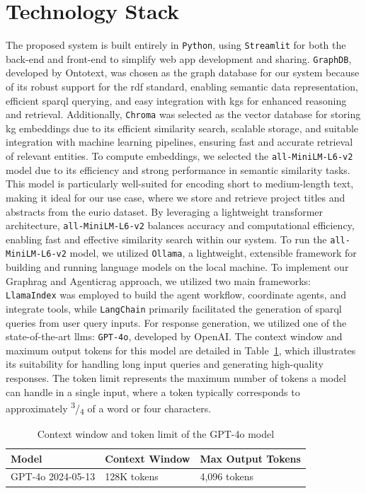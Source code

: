 \section{Technology Stack}\label{sec:technology-stack}
The proposed system is built entirely in \texttt{Python}, using \texttt{Streamlit} for both the back-end and front-end to simplify web app development and sharing.
\texttt{GraphDB}, developed by Ontotext, was chosen as the graph database for our system because of its robust support for the \gls{rdf} standard, enabling semantic data representation, efficient \gls{sparql} querying, and easy integration with \glspl{kg} for enhanced reasoning and retrieval.
Additionally, \texttt{Chroma} was selected as the vector database for storing \gls{kg} embeddings due to its efficient similarity search, scalable storage, and suitable integration with machine learning pipelines, ensuring fast and accurate retrieval of relevant entities.
To compute embeddings, we selected the \texttt{all-MiniLM-L6-v2} model due to its efficiency and strong performance in semantic similarity tasks.
This model is particularly well-suited for encoding short to medium-length text, making it ideal for our use case, where we store and retrieve project titles and abstracts from the \gls{eurio} dataset.
By leveraging a lightweight transformer architecture, \texttt{all-MiniLM-L6-v2} balances accuracy and computational efficiency, enabling fast and effective similarity search within our system.
To run the \texttt{all-MiniLM-L6-v2} model, we utilized \texttt{Ollama}, a lightweight, extensible framework for building and running language models on the local machine.
To implement our Graph\gls{rag} and Agentic\gls{rag} approach, we utilized two main frameworks: \texttt{LlamaIndex} was employed to build the agent workflow, coordinate agents, and integrate tools, while \texttt{LangChain} primarily facilitated the generation of \gls{sparql} queries from user query inputs.
For response generation, we utilized one of the state-of-the-art \glspl{llm}: \texttt{GPT-4o}, developed by OpenAI.
The context window and maximum output tokens for this model are detailed in Table~\ref{table:gpt-4o-tokens}, which illustrates its suitability for handling long input queries and generating high-quality responses.
The token limit represents the maximum number of tokens a model can handle in a single input, where a token typically corresponds to approximately \textsuperscript{3}/\textsubscript{4} of a word or four characters.

\begin{table}[htbp]
    \centering
    \scriptsize
    \begin{tabularx}{\textwidth}{|X|X|X|}
      \hline
      \textbf{Model} & \textbf{Context Window} & \textbf{Max Output Tokens}\\
      \hline
      GPT-4o 2024-05-13 & 128K tokens & 4,096 tokens\\
      \hline
    \end{tabularx}
    \caption{Context window and token limit of the GPT-4o model}
    \label{table:gpt-4o-tokens}
\end{table}


